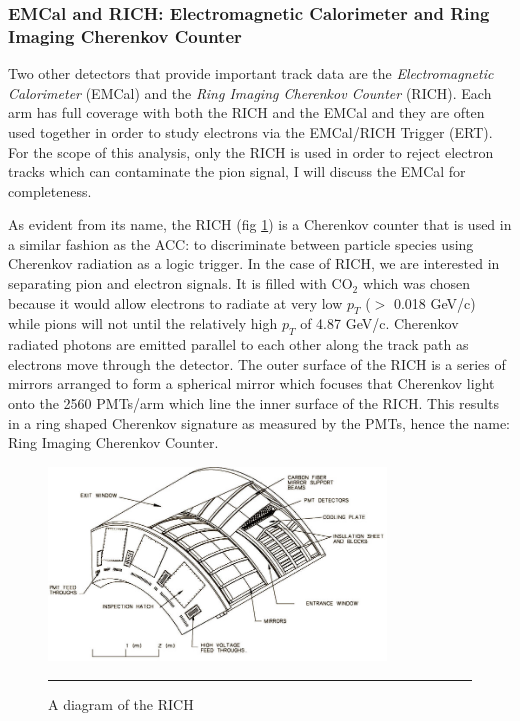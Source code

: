 \subsubsection{EMCal and RICH: Electromagnetic Calorimeter and Ring Imaging Cherenkov Counter}
Two other detectors that provide important track data are the \textit{Electromagnetic Calorimeter} (EMCal) and the \textit{Ring Imaging Cherenkov Counter} (RICH). Each arm has full coverage with both the RICH and the EMCal and they are often used together in order to study electrons via the EMCal/RICH Trigger (ERT). For the scope of this analysis, only the RICH is used in order to reject electron tracks which can contaminate the pion signal, I will discuss the EMCal for completeness.

As evident from its name, the RICH (fig \ref{fig:RICHdiagram}) is a Cherenkov counter that is used in a similar fashion as the ACC: to discriminate between particle species using Cherenkov radiation as a logic trigger. In the case of RICH, we are interested in separating pion and electron signals. It is filled with CO$_2$ which was chosen because it would allow electrons to radiate at very low $p_T$ ($>$ 0.018 GeV/c) while pions will not until the relatively high $p_T$ of 4.87 GeV/c. Cherenkov radiated photons are emitted parallel to each other along the track path as electrons move through the detector. The outer surface of the RICH is a series of mirrors arranged to form a spherical mirror which focuses that Cherenkov light onto the 2560 PMTs/arm which line the inner surface of the RICH. This results in a ring shaped Cherenkov signature as measured by the PMTs, hence the name: Ring Imaging Cherenkov Counter. 

\begin{figure}[h!]
  \centering
    \includegraphics[width=0.8\textwidth]{Figures/RICHdiagram.jpg}
    \rule{35em}{0.5pt}
  \caption[A diagram of the RICH]{A diagram of the RICH}
  \label{fig:RICHdiagram}
\end{figure}

